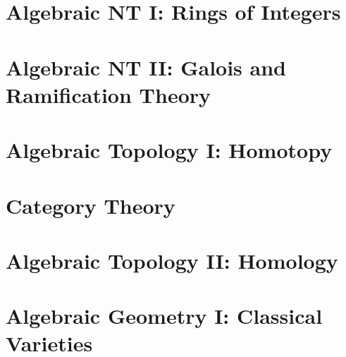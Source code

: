 \documentclass[11pt,twoside=semi,openright,numbers=noenddot]{scrbook}
\begin{document}
\part{Algebraic NT I: Rings of Integers}
\label{part:algnt1}
\parttoc







\part{Algebraic NT II: Galois and Ramification Theory}
\label{part:algnt2}
\parttoc





\part{Algebraic Topology I: Homotopy}
\label{part:algtop1}
\parttoc



\part{Category Theory}
\label{part:cats}
\parttoc



\part{Algebraic Topology II: Homology}
\label{part:algtop2}
\parttoc





\part{Algebraic Geometry I: Classical Varieties}
\label{part:ag1}
\parttoc




\end{document}
